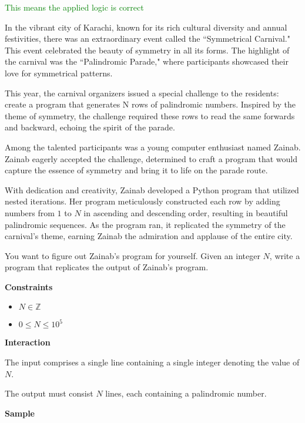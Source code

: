 \documentclass[a4paper]{exam}
\newcommand\heading[1]{\textbf{#1}}
\begin{document}
\begin{questions}
 \textcolor{green}{This means the applied logic is correct}




  In the vibrant city of Karachi, known for its rich cultural diversity and annual festivities, there was an extraordinary event called the ``Symmetrical Carnival." This event celebrated the beauty of symmetry in all its forms. The highlight of the carnival was the ``Palindromic Parade," where participants showcased their love for symmetrical patterns.

This year, the carnival organizers issued a special challenge to the residents: create a program that generates N rows of palindromic numbers. Inspired by the theme of symmetry, the challenge required these rows to read the same forwards and backward, echoing the spirit of the parade.

Among the talented participants was a young computer enthusiast named Zainab. Zainab eagerly accepted the challenge, determined to craft a program that would capture the essence of symmetry and bring it to life on the parade route.

With dedication and creativity, Zainab developed a Python program that utilized nested iterations. Her program meticulously constructed each row by adding numbers from $1$ to $N$ in ascending and descending order, resulting in beautiful palindromic sequences. As the program ran, it replicated the symmetry of the carnival's theme, earning Zainab the admiration and applause of the entire city.

You want to figure out Zainab's program for yourself. Given an integer $N$, write a program that replicates the output of Zainab's program.

  \heading{Constraints}
  \begin{itemize}
    \item $N \in \mathbb{Z}$
    \item $0 \leq N \leq 10^{5}$
  \end{itemize}

  \heading{Interaction}

  The input comprises a single line containing a single integer denoting the value of $N$.

  The output must consist $N$ lines, each containing a palindromic number.

  \heading{Sample}


\end{questions}
\end{document}
